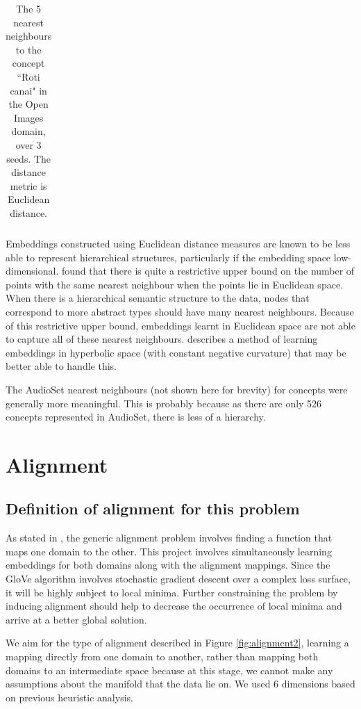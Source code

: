 \begin{table}[H]
\begin{tabular}{@{}llll@{}}
\end{tabular}
\centering
\caption{The 5 nearest neighbours to the concept ``Roti canai" in the Open Images domain, over 3 seeds. The distance metric is Euclidean distance. }
\end{table}

Embeddings constructed using Euclidean distance measures are known to be less able to represent hierarchical structures, particularly if the embedding space low-dimensional. \cite{NNAnalysisPsychologicalSpaces} found that there is quite a restrictive upper bound on the number of points with the same nearest neighbour when the points lie in Euclidean space. When there is a hierarchical semantic structure to the data, nodes that correspond to more abstract types should have many nearest neighbours. Because of this restrictive upper bound, embeddings learnt in Euclidean space are not able to capture all of these nearest neighbours. \cite{PoincareEmbeddings} describes a method of learning embeddings in hyperbolic space (with constant negative curvature) that may be better able to handle this.

The AudioSet nearest neighbours (not shown here for brevity) for concepts were generally more meaningful. This is probably because as there are only 526 concepts represented in AudioSet, there is less of a hierarchy. 


\section{Alignment}

\subsection{Definition of alignment for this problem}
\label{section:alignmentdef}
As stated in \cite{ManifoldLearningTheoryAndApplications}, the generic alignment problem involves finding a function that maps one domain to the other. This project involves simultaneously learning embeddings for both domains along with the alignment mappings. Since the GloVe algorithm involves stochastic gradient descent over a complex loss surface, it will be highly subject to local minima. Further constraining the problem by inducing alignment should help to decrease the occurrence of local minima and arrive at a better global solution. 

We aim for the type of alignment described in Figure \ref{fig:alignment2}, learning a mapping directly from one domain to another, rather than mapping both domains to an intermediate space because at this stage, we cannot make any assumptions about the manifold that the data lie on. We used 6 dimensions based on previous heuristic analysis.  


